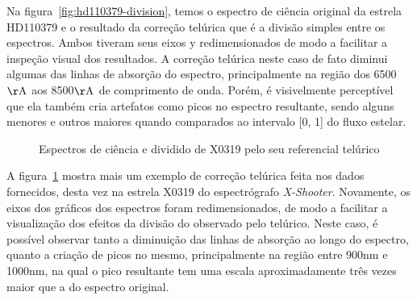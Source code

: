 Na figura~\ref{fig:hd110379-division}, temos o espectro de ciência original da estrela HD110379 e o resultado da correção telúrica que é a divisão simples entre os espectros. Ambos tiveram seus eixos y redimensionados de modo a facilitar a inspeção visual dos resultados.  A correção telúrica neste caso de fato diminui algumas das linhas de absorção do espectro, principalmente na região dos 6500$\mathrm{\AA}$ aos 8500$\mathrm{\AA}$ de comprimento de onda. Porém, é visivelmente perceptível que ela também cria artefatos como picos no espectro resultante, sendo alguns menores e outros maiores quando comparados ao intervalo [0, 1] do fluxo estelar.

\begin{figure}[htb]
  \centering
  \hfill
  \caption{Espectros de ciência e dividido de X0319 pelo seu referencial telúrico}
  \label{fig:x0319-division}
\end{figure}

A figura~\ref{fig:x0319-division} mostra mais um exemplo de correção telúrica feita nos dados fornecidos, desta vez na estrela X0319 do espectrógrafo \textit{X-Shooter}. Novamente, os eixos dos gráficos dos espectros foram redimensionados, de modo a facilitar a visualização dos efeitos da divisão do observado pelo telúrico. Neste caso, é possível observar tanto a diminuição das linhas de absorção ao longo do espectro, quanto a criação de picos no mesmo, principalmente na região entre 900nm e 1000nm, na qual o pico resultante tem uma escala aproximadamente três vezes maior que a do espectro original.


